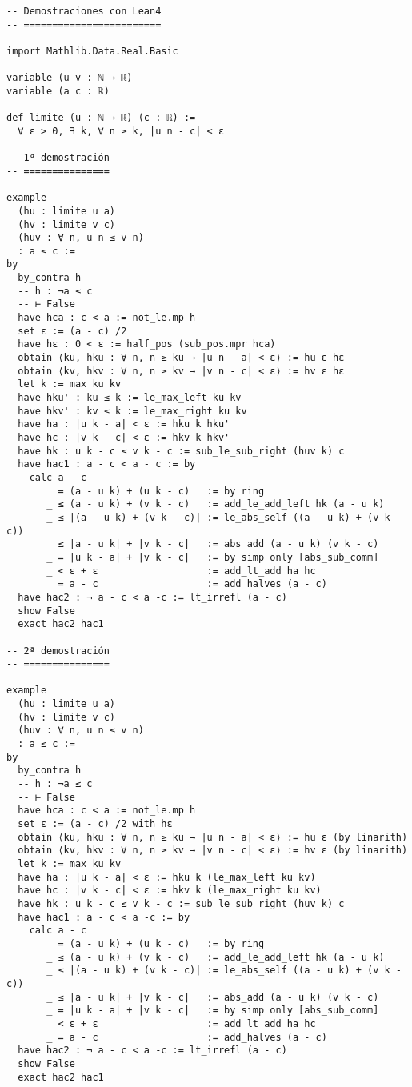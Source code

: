 \begin{verbatim}
-- Demostraciones con Lean4
-- ========================

import Mathlib.Data.Real.Basic

variable (u v : ℕ → ℝ)
variable (a c : ℝ)

def limite (u : ℕ → ℝ) (c : ℝ) :=
  ∀ ε > 0, ∃ k, ∀ n ≥ k, |u n - c| < ε

-- 1ª demostración
-- ===============

example
  (hu : limite u a)
  (hv : limite v c)
  (huv : ∀ n, u n ≤ v n)
  : a ≤ c :=
by
  by_contra h
  -- h : ¬a ≤ c
  -- ⊢ False
  have hca : c < a := not_le.mp h
  set ε := (a - c) /2
  have hε : 0 < ε := half_pos (sub_pos.mpr hca)
  obtain ⟨ku, hku : ∀ n, n ≥ ku → |u n - a| < ε⟩ := hu ε hε
  obtain ⟨kv, hkv : ∀ n, n ≥ kv → |v n - c| < ε⟩ := hv ε hε
  let k := max ku kv
  have hku' : ku ≤ k := le_max_left ku kv
  have hkv' : kv ≤ k := le_max_right ku kv
  have ha : |u k - a| < ε := hku k hku'
  have hc : |v k - c| < ε := hkv k hkv'
  have hk : u k - c ≤ v k - c := sub_le_sub_right (huv k) c
  have hac1 : a - c < a - c := by
    calc a - c
         = (a - u k) + (u k - c)   := by ring
       _ ≤ (a - u k) + (v k - c)   := add_le_add_left hk (a - u k)
       _ ≤ |(a - u k) + (v k - c)| := le_abs_self ((a - u k) + (v k - c))
       _ ≤ |a - u k| + |v k - c|   := abs_add (a - u k) (v k - c)
       _ = |u k - a| + |v k - c|   := by simp only [abs_sub_comm]
       _ < ε + ε                   := add_lt_add ha hc
       _ = a - c                   := add_halves (a - c)
  have hac2 : ¬ a - c < a -c := lt_irrefl (a - c)
  show False
  exact hac2 hac1

-- 2ª demostración
-- ===============

example
  (hu : limite u a)
  (hv : limite v c)
  (huv : ∀ n, u n ≤ v n)
  : a ≤ c :=
by
  by_contra h
  -- h : ¬a ≤ c
  -- ⊢ False
  have hca : c < a := not_le.mp h
  set ε := (a - c) /2 with hε
  obtain ⟨ku, hku : ∀ n, n ≥ ku → |u n - a| < ε⟩ := hu ε (by linarith)
  obtain ⟨kv, hkv : ∀ n, n ≥ kv → |v n - c| < ε⟩ := hv ε (by linarith)
  let k := max ku kv
  have ha : |u k - a| < ε := hku k (le_max_left ku kv)
  have hc : |v k - c| < ε := hkv k (le_max_right ku kv)
  have hk : u k - c ≤ v k - c := sub_le_sub_right (huv k) c
  have hac1 : a - c < a -c := by
    calc a - c
         = (a - u k) + (u k - c)   := by ring
       _ ≤ (a - u k) + (v k - c)   := add_le_add_left hk (a - u k)
       _ ≤ |(a - u k) + (v k - c)| := le_abs_self ((a - u k) + (v k - c))
       _ ≤ |a - u k| + |v k - c|   := abs_add (a - u k) (v k - c)
       _ = |u k - a| + |v k - c|   := by simp only [abs_sub_comm]
       _ < ε + ε                   := add_lt_add ha hc
       _ = a - c                   := add_halves (a - c)
  have hac2 : ¬ a - c < a -c := lt_irrefl (a - c)
  show False
  exact hac2 hac1


\end{verbatim}
